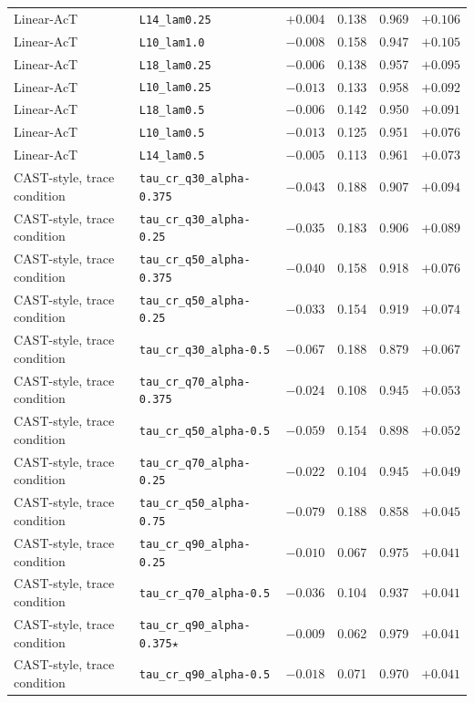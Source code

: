 {\begin{longtable}{l|l|c|cc|c}
Linear-AcT & \texttt{L14\_lam0.25} & $+0.004$ & 0.138 & 0.969 & $+0.106$ \\
Linear-AcT & \texttt{L10\_lam1.0} & $-0.008$ & 0.158 & 0.947 & $+0.105$ \\
Linear-AcT & \texttt{L18\_lam0.25} & $-0.006$ & 0.138 & 0.957 & $+0.095$ \\
Linear-AcT & \texttt{L10\_lam0.25} & $-0.013$ & 0.133 & 0.958 & $+0.092$ \\
Linear-AcT & \texttt{L18\_lam0.5} & $-0.006$ & 0.142 & 0.950 & $+0.091$ \\
Linear-AcT & \texttt{L10\_lam0.5} & $-0.013$ & 0.125 & 0.951 & $+0.076$ \\
Linear-AcT & \texttt{L14\_lam0.5} & $-0.005$ & 0.113 & 0.961 & $+0.073$ \\
CAST-style, trace condition & \texttt{tau\_cr\_q30\_alpha-0.375} & $-0.043$ & 0.188 & 0.907 & $+0.094$ \\
CAST-style, trace condition & \texttt{tau\_cr\_q30\_alpha-0.25} & $-0.035$ & 0.183 & 0.906 & $+0.089$ \\
CAST-style, trace condition & \texttt{tau\_cr\_q50\_alpha-0.375} & $-0.040$ & 0.158 & 0.918 & $+0.076$ \\
CAST-style, trace condition & \texttt{tau\_cr\_q50\_alpha-0.25} & $-0.033$ & 0.154 & 0.919 & $+0.074$ \\
CAST-style, trace condition & \texttt{tau\_cr\_q30\_alpha-0.5} & $-0.067$ & 0.188 & 0.879 & $+0.067$ \\
CAST-style, trace condition & \texttt{tau\_cr\_q70\_alpha-0.375} & $-0.024$ & 0.108 & 0.945 & $+0.053$ \\
CAST-style, trace condition & \texttt{tau\_cr\_q50\_alpha-0.5} & $-0.059$ & 0.154 & 0.898 & $+0.052$ \\
CAST-style, trace condition & \texttt{tau\_cr\_q70\_alpha-0.25} & $-0.022$ & 0.104 & 0.945 & $+0.049$ \\
CAST-style, trace condition & \texttt{tau\_cr\_q50\_alpha-0.75} & $-0.079$ & 0.188 & 0.858 & $+0.045$ \\
CAST-style, trace condition & \texttt{tau\_cr\_q90\_alpha-0.25} & $-0.010$ & 0.067 & 0.975 & $+0.041$ \\
CAST-style, trace condition & \texttt{tau\_cr\_q70\_alpha-0.5} & $-0.036$ & 0.104 & 0.937 & $+0.041$ \\
CAST-style, trace condition & \texttt{tau\_cr\_q90\_alpha-0.375}$\star$ & $-0.009$ & 0.062 & 0.979 & $+0.041$ \\
CAST-style, trace condition & \texttt{tau\_cr\_q90\_alpha-0.5} & $-0.018$ & 0.071 & 0.970 & $+0.041$ \\

\end{longtable}}
